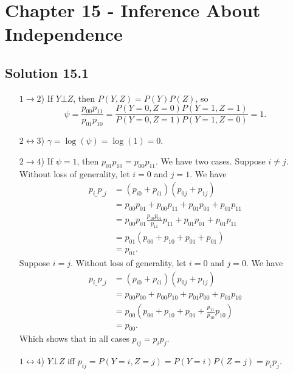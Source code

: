 \section*{Chapter 15 - Inference About Independence}

\subsection*{Solution 15.1}

\begin{itemize}
    \item[$1 \rightarrow 2$)] If $Y \bot Z$, then $P(Y, Z) = P(Y)P(Z)$, so
        \begin{equation*}
            \psi = \frac{p_{00}p_{11}}{p_{01}p_{10}}
                = \frac{P(Y=0,Z=0)P(Y=1,Z=1)}{P(Y=0,Z=1)P(Y=1,Z=0)}
                = 1.
        \end{equation*}
    \item[$2 \leftrightarrow 3$)] $\gamma = \log(\psi) = \log(1) = 0$.
    \item[$2 \rightarrow 4$)] If $\psi = 1$, then $p_{01}p_{10} = p_{00}p_{11}$.
        We have two cases.
        Suppose $i \neq j$.
        Without loss of generality, let $i = 0$ and $j = 1$.
        We have
        \begin{equation*}
            \begin{split}
                p_{i\_} p_{\_j}
                    &= (p_{i0} + p_{i1})(p_{0j} + p_{1j}) \\
                    &= p_{00}p_{01} + p_{00}p_{11} + p_{01}p_{01} + p_{01}p_{11} \\
                    &= p_{00}p_{01} \frac{p_{10}p_{01}}{p_{11}}p_{11} + p_{01}p_{01} + p_{01}p_{11} \\
                    &= p_{01}(p_{00} + p_{10} + p_{01} + p_{01}) \\
                    &= p_{01}.
            \end{split}
        \end{equation*}
        Suppose $i = j$.
        Without loss of generality, let $i = 0$ and $j = 0$.
        We have
        \begin{equation*}
            \begin{split}
                p_{i\_} p_{\_j}
                    &= (p_{i0} + p_{i1})(p_{0j} + p_{1j}) \\
                    &= p_{00}p_{00} + p_{00}p_{10} + p_{01}p_{00} + p_{01}p_{10} \\
                    &= p_{00}(p_{00} + p_{10} + p_{01} + \frac{p_{11}}{p_{10}} p_{10}) \\
                    &= p_{00}.
            \end{split}
        \end{equation*}
        Which shows that in all cases $p_{ij} = p_ip_j$.
    \item[$1 \leftrightarrow 4$)] $Y \bot Z$ iff $p_{ij} = P(Y=i,Z=j) = P(Y=i)P(Z=j) = p_ip_j$.
\end{itemize}



